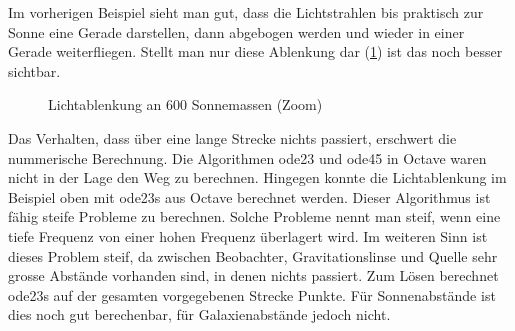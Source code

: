 \begin{refsection}
Im vorherigen Beispiel sieht man gut, dass die Lichtstrahlen bis
praktisch zur Sonne eine Gerade darstellen, dann abgebogen werden und
wieder in einer Gerade weiterfliegen.  Stellt man nur diese Ablenkung
dar (\ref{fig:lichtablenkung600SonneZoom}) ist das noch besser
sichtbar.

\begin{figure}
  \centering
  \caption{Lichtablenkung an 600 Sonnemassen (Zoom)}
  \label{fig:lichtablenkung600SonneZoom}
\end{figure}

Das Verhalten, dass über eine lange Strecke nichts passiert, erschwert
die nummerische Berechnung.  Die Algorithmen ode23 und ode45 in Octave
waren nicht in der Lage den Weg zu berechnen.  Hingegen konnte die
Lichtablenkung im Beispiel oben mit ode23s aus Octave berechnet
werden.  Dieser Algorithmus ist fähig steife Probleme zu berechnen.
Solche Probleme nennt man steif, wenn eine tiefe Frequenz von einer
hohen Frequenz überlagert wird.  Im weiteren Sinn ist dieses Problem
steif, da zwischen Beobachter, Gravitationslinse und Quelle sehr
grosse Abstände vorhanden sind, in denen nichts passiert.  Zum Lösen
berechnet ode23s auf der gesamten vorgegebenen Strecke Punkte.  Für
Sonnenabstände ist dies noch gut berechenbar, für Galaxienabstände
jedoch nicht.


\printbibliography[heading=subbibliography]
\end{refsection}

